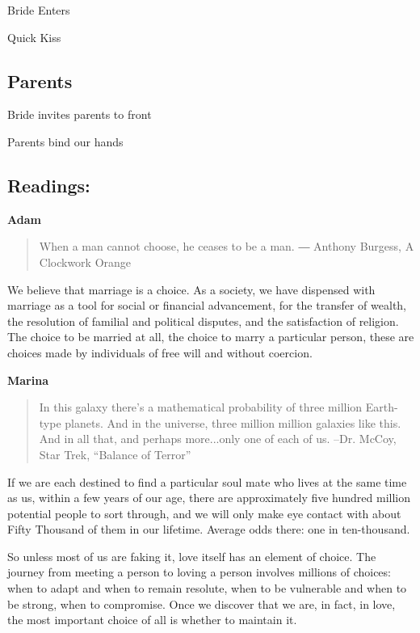 \documentclass[twoside]{article}
\begin{document}
      Bride Enters
  		
      Quick Kiss
	  
    \subsection{Parents} 
     
     Bride invites parents to front
     
     Parents bind our hands

  	\subsection{Readings:}

      \begin{center}
        \textbf{Adam}
      \end{center}
      \begin{quote}
        When a man cannot choose, he ceases to be a man.
        ― Anthony Burgess, A Clockwork Orange
      \end{quote}

We believe that marriage is a choice. As a society, we have dispensed with marriage as a tool for social or financial advancement, for the transfer of wealth, the resolution of familial and political disputes, and the satisfaction of religion. The choice to be married at all, the choice to marry a particular person, these are choices made by individuals of free will and without coercion. 

      \begin{center}
        \textbf{Marina}
      \end{center}
      \begin{quote}
        In this galaxy there’s a mathematical probability of three million Earth-type planets. And in the universe, three million million galaxies like this. And in all that, and perhaps more...only one of each of us.
        --Dr. McCoy, Star Trek, “Balance of Terror”
      \end{quote}

If we are each destined to find a particular soul mate who lives at the same time as us, within a few years of our age, there are approximately five hundred million potential people to sort through, and we will only make eye contact with about Fifty Thousand of them in our lifetime. Average odds there: one in ten-thousand. 

So unless most of us are faking it, love itself has an element of choice. The journey from meeting a person to loving a person involves millions of choices: when to adapt and when to remain resolute, when to be vulnerable and when to be strong, when to compromise. Once we discover that we are, in fact, in love, the most important choice of all is whether to maintain it. 
	
\end{document}
